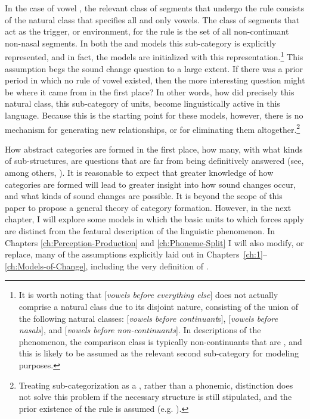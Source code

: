 In the case of vowel , the relevant class of segments that
undergo the rule consists of the natural class that specifies all
and only vowels. The class of segments that act as the trigger, or
environment, for the rule is the set of all non-continuant non-nasal
 segments. In both the  and  models
this sub-category is explicitly represented, and in fact, the models
are initialized with this representation.\footnote{It is worth noting that {[}\emph{vowels before everything else}{]}
does not actually comprise a natural class due to its disjoint nature,
consisting of the union of the following natural classes: {[}\emph{vowels
before continuant}s{]}, {[}\emph{vowels before nasals}{]}, and {[}\emph{vowels
before  non-continuants}{]}. In descriptions of the phenomenon,
the comparison class is typically non-continuants that are ,
and this is likely to be assumed as the relevant second sub-category
for modeling purposes.} This assumption begs the sound change question to a large extent.
If there was a prior period in which no rule of vowel 
existed, then the more interesting question might be where it came
from in the first place? In other words, how did precisely this natural
class, this sub-category of  units, become linguistically
active in this language. Because this is the starting point for
these models, however, there is no mechanism for generating new 
relationships, or for eliminating them altogether.\footnote{Treating sub-categorization as a , rather than a phonemic,
distinction does not solve this problem if the necessary structure
is still stipulated, and the prior existence of the  rule
is assumed (e.g. \citealp{dillon2013single}).}

How abstract categories are formed in the first place, how many,
with what kinds of sub-structures, are questions that are far from
being definitively answered (see, among others, \citealt{Peperkamp2006,dillon2013single,feldman2009learning,mcmurray2011information,goldsmith2009learning}).
It is reasonable to expect that greater knowledge of how categories
are formed will lead to greater insight into how sound changes occur,
and what kinds of sound changes are possible. It is beyond the scope
of this paper to propose a general theory of category formation. However,
in the next chapter, I will explore some models in which the basic
units to which forces apply are distinct from the featural description
of the linguistic phenomenon. In Chapters \ref{ch:Perception-Production}
and \ref{ch:Phoneme-Split} I will also modify, or replace, many
of the assumptions explicitly laid out in Chapters~\ref{ch:1}--\ref{ch:Models-of-Change},
including the very definition of .
